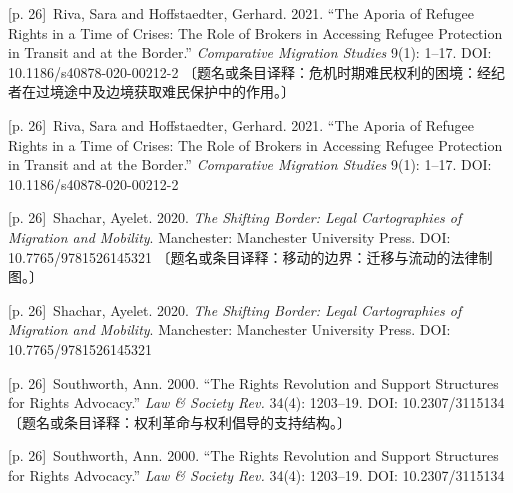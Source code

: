 \documentclass[10pt,a4paper]{article}
\begin{document}
\noindent\begin{minipage}{\textwidth}\begin{minipage}[t]{\dimexpr.5\textwidth-4mm\relax}{\scriptsize\color{gray} [p. 26]}\ Riva, Sara and Hoffstaedter, Gerhard. 2021. “The Aporia of Refugee Rights in a Time of Crises: The Role of Brokers in Accessing Refugee Protection in Transit and at the Border.” \textit{Comparative Migration Studies} 9(1): 1–17. DOI: 10.1186/s40878-020-00212-2 〔题名或条目译释：危机时期难民权利的困境：经纪者在过境途中及边境获取难民保护中的作用。〕\par\end{minipage}\hfill\begin{minipage}[t]{\dimexpr.5\textwidth-4mm\relax}{\scriptsize\color{gray} [p. 26]}\ Riva, Sara and Hoffstaedter, Gerhard. 2021. “The Aporia of Refugee Rights in a Time of Crises: The Role of Brokers in Accessing Refugee Protection in Transit and at the Border.” \textit{Comparative Migration Studies} 9(1): 1–17. DOI: 10.1186/s40878-020-00212-2\par\end{minipage}\end{minipage}\par
\noindent\begin{minipage}{\textwidth}\begin{minipage}[t]{\dimexpr.5\textwidth-4mm\relax}{\scriptsize\color{gray} [p. 26]}\ Shachar, Ayelet. 2020. \textit{The Shifting Border: Legal Cartographies of Migration and Mobility}. Manchester: Manchester University Press. DOI: 10.7765/9781526145321 〔题名或条目译释：移动的边界：迁移与流动的法律制图。〕\par\end{minipage}\hfill\begin{minipage}[t]{\dimexpr.5\textwidth-4mm\relax}{\scriptsize\color{gray} [p. 26]}\ Shachar, Ayelet. 2020. \textit{The Shifting Border: Legal Cartographies of Migration and Mobility}. Manchester: Manchester University Press. DOI: 10.7765/9781526145321\par\end{minipage}\end{minipage}\par
\noindent\begin{minipage}{\textwidth}\begin{minipage}[t]{\dimexpr.5\textwidth-4mm\relax}{\scriptsize\color{gray} [p. 26]}\ Southworth, Ann. 2000. “The Rights Revolution and Support Structures for Rights Advocacy.” \textit{Law \& Society Rev.} 34(4): 1203–19. DOI: 10.2307/3115134 〔题名或条目译释：权利革命与权利倡导的支持结构。〕\par\end{minipage}\hfill\begin{minipage}[t]{\dimexpr.5\textwidth-4mm\relax}{\scriptsize\color{gray} [p. 26]}\ Southworth, Ann. 2000. “The Rights Revolution and Support Structures for Rights Advocacy.” \textit{Law \& Society Rev.} 34(4): 1203–19. DOI: 10.2307/3115134\par\end{minipage}\end{minipage}\par
\end{document}
